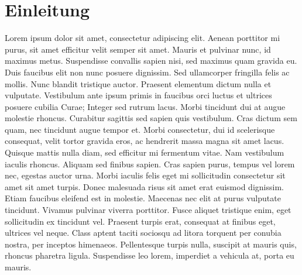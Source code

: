 
\chapter{Einleitung}

 Lorem ipsum dolor sit amet, consectetur adipiscing elit. Aenean porttitor mi purus, sit amet efficitur velit semper sit amet. Mauris et pulvinar nunc, id maximus metus. Suspendisse convallis sapien nisi, sed maximus quam gravida eu. Duis faucibus elit non nunc posuere dignissim. Sed ullamcorper fringilla felis ac mollis. Nunc blandit tristique auctor. Praesent elementum dictum nulla et vulputate. Vestibulum ante ipsum primis in faucibus orci luctus et ultrices posuere cubilia Curae; Integer sed rutrum lacus. Morbi tincidunt dui at augue molestie rhoncus. Curabitur sagittis sed sapien quis vestibulum. Cras dictum sem quam, nec tincidunt augue tempor et. Morbi consectetur, dui id scelerisque consequat, velit tortor gravida eros, ac hendrerit massa magna sit amet lacus. Quisque mattis nulla diam, sed efficitur mi fermentum vitae. Nam vestibulum iaculis rhoncus.\newpar
 Aliquam sed finibus sapien. Cras sapien purus, tempus vel lorem nec, egestas auctor urna. Morbi iaculis felis eget mi sollicitudin consectetur sit amet sit amet turpis. Donec malesuada risus sit amet erat euismod dignissim. Etiam faucibus eleifend est in molestie. Maecenas nec elit at purus vulputate tincidunt. Vivamus pulvinar viverra porttitor. Fusce aliquet tristique enim, eget sollicitudin ex tincidunt vel. Praesent turpis erat, consequat at finibus eget, ultrices vel neque. Class aptent taciti sociosqu ad litora torquent per conubia nostra, per inceptos himenaeos. Pellentesque turpis nulla, suscipit at mauris quis, rhoncus pharetra ligula. Suspendisse leo lorem, imperdiet a vehicula at, porta eu mauris. 

\clearpage
